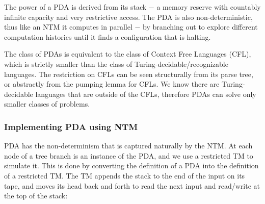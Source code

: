 \documentclass[12pt]{article}  %
\begin{document}
The power of a PDA is derived from its stack $-$ a memory reserve with countably infinite capacity and very restrictive access. The PDA is also non-deterministic, thus like an NTM it computes in parallel $-$ by branching out to explore different computation histories until it finds a configuration that is halting.

The class of PDAs is equivalent to the class of Context Free Languages (CFL), which is strictly smaller than the class of Turing-decidable/recognizable languages. The restriction on CFLs can be seen structurally from its parse tree, or abstractly from the pumping lemma for CFLs. We know there are Turing-decidable languages that are outside of the CFLs, therefore PDAs can solve only smaller classes of problems. 




\subsubsection{Implementing PDA using NTM}
PDA has the non-determinism that is captured naturally by the NTM. At each node of a tree branch is an instance of the PDA, and we use a restricted TM to simulate it. This is done by converting the definition of a PDA into the definition of a restricted TM. The TM appends the stack to the end of the input on its tape, and moves its head back and forth to read the next input and read/write at the top of the stack:
\end{document}
